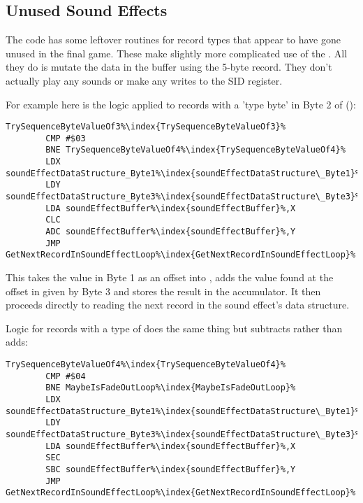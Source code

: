 \subsection{Unused Sound Effects}
The  code has some leftover routines for record types that appear to have gone unused in the final
game. These make slightly more complicated use of the . All they do is mutate the data in the buffer
using the 5-byte record. They don't actually play any sounds or make any writes to the SID register.

For example here is the logic applied to records with a 'type byte' in Byte 2 of ():

\begin{lstlisting}[escapechar=\%]
TrySequenceByteValueOf3%\index{TrySequenceByteValueOf3}%   
        CMP #$03
        BNE TrySequenceByteValueOf4%\index{TrySequenceByteValueOf4}%
        LDX soundEffectDataStructure_Byte1%\index{soundEffectDataStructure\_Byte1}%
        LDY soundEffectDataStructure_Byte3%\index{soundEffectDataStructure\_Byte3}%
        LDA soundEffectBuffer%\index{soundEffectBuffer}%,X
        CLC
        ADC soundEffectBuffer%\index{soundEffectBuffer}%,Y
        JMP GetNextRecordInSoundEffectLoop%\index{GetNextRecordInSoundEffectLoop}%
\end{lstlisting}

This takes the value in Byte 1 as an offset into , adds the value found at the offset in 
given by Byte 3 and stores the result in the  accumulator. It then proceeds directly to reading the next record in the sound
effect's data structure.

Logic for records with a type of  does the same thing but subtracts rather than adds:

\begin{lstlisting}[escapechar=\%]
TrySequenceByteValueOf4%\index{TrySequenceByteValueOf4}%   
        CMP #$04
        BNE MaybeIsFadeOutLoop%\index{MaybeIsFadeOutLoop}%
        LDX soundEffectDataStructure_Byte1%\index{soundEffectDataStructure\_Byte1}%
        LDY soundEffectDataStructure_Byte3%\index{soundEffectDataStructure\_Byte3}%
        LDA soundEffectBuffer%\index{soundEffectBuffer}%,X
        SEC
        SBC soundEffectBuffer%\index{soundEffectBuffer}%,Y
        JMP GetNextRecordInSoundEffectLoop%\index{GetNextRecordInSoundEffectLoop}%
\end{lstlisting}

